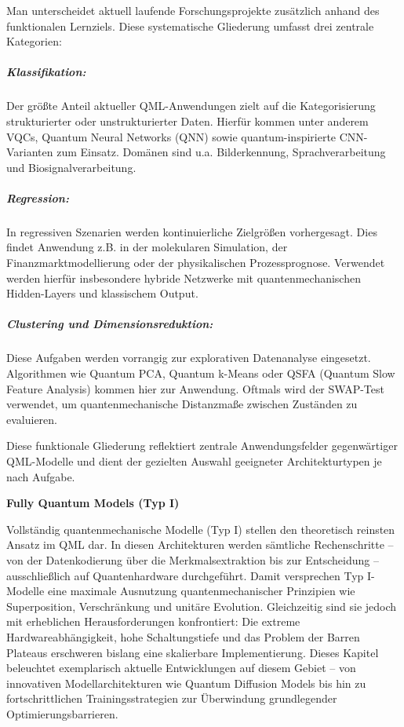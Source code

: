 \vspace{0.5em}
\noindent
Man unterscheidet aktuell laufende Forschungsprojekte zusätzlich anhand des funktionalen Lernziels. Diese systematische Gliederung umfasst drei zentrale Kategorien:
\subparagraph{Klassifikation:}
Der größte Anteil aktueller QML-Anwendungen zielt auf die Kategorisierung strukturierter oder unstrukturierter Daten. Hierfür kommen unter anderem VQCs, Quantum Neural Networks (QNN) sowie quantum-inspirierte CNN-Varianten zum Einsatz. Domänen sind u.a. Bilderkennung, Sprachverarbeitung und Biosignalverarbeitung.
\subparagraph{Regression:}
In regressiven Szenarien werden kontinuierliche Zielgrößen vorhergesagt. Dies findet Anwendung z.B. in der molekularen Simulation, der Finanzmarktmodellierung oder der physikalischen Prozessprognose. Verwendet werden hierfür insbesondere hybride Netzwerke mit quantenmechanischen Hidden-Layers und klassischem Output.
\subparagraph{Clustering und Dimensionsreduktion:}
Diese Aufgaben werden vorrangig zur explorativen Datenanalyse eingesetzt. Algorithmen wie Quantum PCA, Quantum k-Means oder QSFA (Quantum Slow Feature Analysis) kommen hier zur Anwendung. Oftmals wird der SWAP-Test verwendet, um quantenmechanische Distanzmaße zwischen Zuständen zu evaluieren. \cite{chengNoisyIntermediatescaleQuantum2023}

\vspace{1em}
\noindent
Diese funktionale Gliederung reflektiert zentrale Anwendungsfelder gegenwärtiger QML-Modelle und dient der gezielten Auswahl geeigneter Architekturtypen je nach Aufgabe.


\vspace{1.5em}
\noindent\textbf{Fully Quantum Models (Typ I)}

\noindent
Vollständig quantenmechanische Modelle (Typ I) stellen den theoretisch reinsten Ansatz im QML dar. In diesen Architekturen werden sämtliche Rechenschritte – von der Datenkodierung über die Merkmalsextraktion bis zur Entscheidung – ausschließlich auf Quantenhardware durchgeführt. Damit versprechen Typ I-Modelle eine maximale Ausnutzung quantenmechanischer Prinzipien wie Superposition, Verschränkung und unitäre Evolution.
Gleichzeitig sind sie jedoch mit erheblichen Herausforderungen konfrontiert: Die extreme Hardwareabhängigkeit, hohe Schaltungstiefe und das Problem der Barren Plateaus erschweren bislang eine skalierbare Implementierung. Dieses Kapitel beleuchtet exemplarisch aktuelle Entwicklungen auf diesem Gebiet – von innovativen Modellarchitekturen wie Quantum Diffusion Models bis hin zu fortschrittlichen Trainingsstrategien zur Überwindung grundlegender Optimierungsbarrieren.

